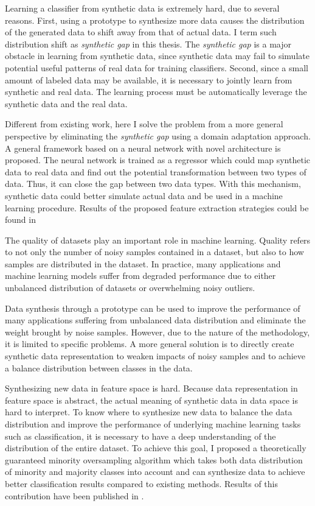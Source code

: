 \documentclass{iitthesis}
\begin{document}
 Learning a classifier from synthetic data is extremely hard, due to several reasons. First, using a prototype to synthesize more data causes the distribution of the generated data to shift away from that of actual data. I term such distribution shift as \textit{synthetic gap} in this thesis. The \textit{synthetic gap} is a major obstacle in learning from synthetic data, since synthetic data may fail to simulate potential useful patterns of real data for training classifiers. Second, since a small amount of labeled data may be available, it is necessary to jointly learn from synthetic and real data. The learning process must be automatically leverage the synthetic data and the real data. 

Different from existing work, here I solve the problem from a more general perspective by eliminating the \textit{synthetic gap} using a domain adaptation approach. A general framework based on a neural network with novel architecture is proposed. The neural network is trained as a regressor which could map synthetic data to real data and find out the potential transformation between two types of data. Thus, it can close the gap between two data types. With this mechanism, synthetic data could better simulate actual data and be used in a machine learning procedure. Results of the proposed feature extraction strategies could be found in \cite{7424358}\cite{ZX17:SMAE}

 The quality of datasets play an important role in machine learning. Quality refers to not only the number of noisy samples contained in a dataset, but also to how samples are distributed in the dataset. In practice, many applications and machine learning models suffer from degraded performance due to either unbalanced distribution of datasets or overwhelming noisy outliers.

Data synthesis through a prototype can be used to improve the performance of many applications suffering from unbalanced data distribution and eliminate the weight brought by noise samples. However, due to the nature of the methodology, it is limited to specific problems.  A more general solution is to directly create synthetic data representation to weaken impacts of noisy samples and to achieve a balance distribution between classes in the data.

Synthesizing new data in feature space is hard. Because data representation in feature space is abstract, the actual meaning of synthetic data in data space is hard to interpret. To know where to synthesize new data to balance the data distribution and improve the performance of underlying machine learning tasks such as classification, it is necessary to have a deep understanding of the distribution of the entire dataset. To achieve this goal, I proposed a theoretically guaranteed minority oversampling algorithm which takes both data distribution of minority and majority classes into account and can synthesize data to achieve better classification results compared to existing methods. Results of this contribution have been published in \cite{Zhang:2016:CCG:2983323.2983789}.
\end{document}
